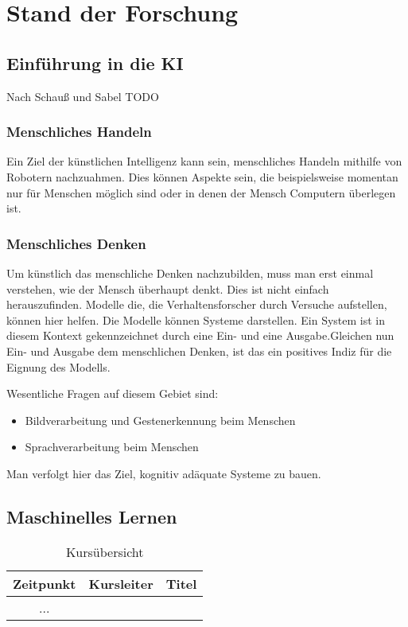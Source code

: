 \chapter{Stand der Forschung}
\section{Einführung in die KI}
Nach Schauß und Sabel
TODO
\subsection{Menschliches Handeln}
Ein Ziel der künstlichen Intelligenz kann sein, menschliches Handeln mithilfe von Robotern nachzuahmen. Dies können Aspekte sein, die beispielsweise momentan nur für Menschen möglich sind oder in denen der Mensch Computern überlegen ist.    

\subsection{Menschliches Denken}
Um künstlich das menschliche Denken nachzubilden, muss  man erst einmal verstehen, wie der Mensch überhaupt denkt. Dies ist nicht einfach herauszufinden. Modelle die, die Verhaltensforscher durch Versuche aufstellen,  können hier helfen. Die Modelle können Systeme darstellen. Ein System ist in diesem Kontext gekennzeichnet durch eine Ein- und eine Ausgabe.Gleichen nun Ein- und Ausgabe dem menschlichen Denken, ist das ein positives Indiz für die Eignung des Modells.

Wesentliche Fragen auf diesem Gebiet sind:
\begin{itemize}
\item Bildverarbeitung und Gestenerkennung beim Menschen
\item Sprachverarbeitung beim Menschen
\end{itemize}    

Man verfolgt hier das Ziel, kognitiv adäquate Systeme zu bauen. 
\

\section{Maschinelles Lernen}

\begin{table}
\caption{ Kursübersicht}
\begin{tabular}{|c|c|c|}
\hline
Zeitpunkt & Kursleiter & Titel \\
\hline 
 ...   
\end{tabular}
\end{table}